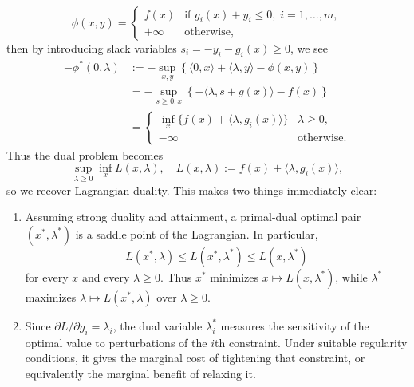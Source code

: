 \documentclass[11pt]{article}
\begin{document}
\[\phi(x, y) = \begin{cases}
  f(x) & \text{if } g_i(x) + y_i \leq 0, \; i = 1, \ldots, m,\\
    +\infty & \text{otherwise},
\end{cases}\]
%
then by introducing slack variables $s_i = -y_i - g_i(x) \geq 0$, we see
%
\begin{align*}
  -\phi^*(0, \lambda) & := -\sup_{x,y} \left\{\langle 0, x \rangle + \langle \lambda, y \rangle - \phi(x, y) \right\} \\
  & = -\sup_{s \geq 0, x} \left\{-\langle \lambda, s + g(x) \rangle - f(x) \right\} \\[5pt]
  & = \begin{cases}
           \inf_x \{f(x) + \langle \lambda, g_i(x) \rangle\} & \lambda \geq 0,\\
           - \infty & \text{otherwise}.
      \end{cases}
\end{align*}
\noindent Thus the dual problem becomes
%
  \[\sup_{\lambda \geq 0} \inf_x L(x, \lambda), \quad L(x, \lambda) := f(x) + \langle \lambda, g_i(x) \rangle, \]
%
\noindent so we recover Lagrangian duality. This makes two things immediately clear:
%
\begin{enumerate}[label=(\roman*)]
  \item Assuming strong duality and attainment, a primal-dual optimal
  pair $(x^*,\lambda^*)$ is a saddle point of the Lagrangian. In particular,
  \[
    L(x^*,\lambda)
    \leq L(x^*,\lambda^*)
    \leq L(x,\lambda^*)
  \]
  for every $x$ and every $\lambda\geq 0$. Thus $x^*$ minimizes
  $x\mapsto L(x,\lambda^*)$, while $\lambda^*$ maximizes
  $\lambda\mapsto L(x^*,\lambda)$ over $\lambda\geq0$.

  \item Since $\partial L / \partial g_i = \lambda_i$, the dual variable $\lambda_i^*$ measures the sensitivity of the
  optimal value to perturbations of the $i$th constraint. Under suitable
  regularity conditions, it gives the marginal cost of tightening that
  constraint, or equivalently the marginal benefit of relaxing it.
\end{enumerate}



\end{document}
